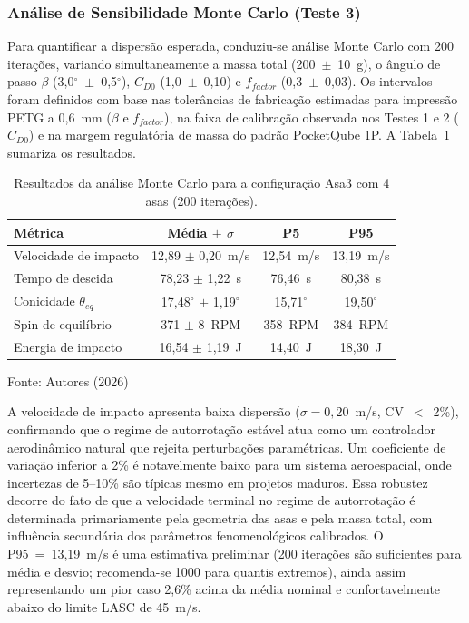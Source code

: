 \documentclass[12pt,fleqn]{article}
\begin{document}
\subsubsection*{Análise de Sensibilidade Monte Carlo (Teste 3)}

Para quantificar a dispersão esperada, conduziu-se análise Monte Carlo com 200 iterações, variando simultaneamente a massa total (200~$\pm$~10~g), o ângulo de passo $\beta$ (3,0$^\circ$~$\pm$~0,5$^\circ$), $C_{D0}$ (1,0~$\pm$~0,10) e $f_{factor}$ (0,3~$\pm$~0,03). Os intervalos foram definidos com base nas tolerâncias de fabricação estimadas para impressão PETG a 0,6~mm ($\beta$ e $f_{factor}$), na faixa de calibração observada nos Testes 1 e 2 ($C_{D0}$) e na margem regulatória de massa do padrão PocketQube 1P. A Tabela~\ref{tab:mc} sumariza os resultados.

\begin{table}[htbp]
\caption{Resultados da análise Monte Carlo para a configuração Asa3 com 4 asas (200 iterações).}
\centering
\begin{tabular*}{\textwidth}{@{\extracolsep{\fill}}lccc}
\hline
Métrica & Média $\pm$ $\sigma$ & P5 & P95 \\
\hline
Velocidade de impacto & 12,89 $\pm$ 0,20~m/s & 12,54~m/s & 13,19~m/s \\
Tempo de descida & 78,23 $\pm$ 1,22~s & 76,46~s & 80,38~s \\
Conicidade $\theta_{eq}$ & 17,48$^\circ$ $\pm$ 1,19$^\circ$ & 15,71$^\circ$ & 19,50$^\circ$ \\
Spin de equilíbrio & 371 $\pm$ 8~RPM & 358~RPM & 384~RPM \\
Energia de impacto & 16,54 $\pm$ 1,19~J & 14,40~J & 18,30~J \\
\hline
\end{tabular*}
{\footnotesize\centering Fonte: Autores (2026)\par}
\label{tab:mc}
\end{table}

A velocidade de impacto apresenta baixa dispersão ($\sigma = 0,20$~m/s, CV~$<$~2\%), confirmando que o regime de autorrotação estável atua como um controlador aerodinâmico natural que rejeita perturbações paramétricas. Um coeficiente de variação inferior a 2\% é notavelmente baixo para um sistema aeroespacial, onde incertezas de 5--10\% são típicas mesmo em projetos maduros. Essa robustez decorre do fato de que a velocidade terminal no regime de autorrotação é determinada primariamente pela geometria das asas e pela massa total, com influência secundária dos parâmetros fenomenológicos calibrados. O P95~=~13,19~m/s é uma estimativa preliminar (200 iterações são suficientes para média e desvio; recomenda-se 1000 para quantis extremos), ainda assim representando um pior caso 2,6\% acima da média nominal e confortavelmente abaixo do limite LASC de 45~m/s.
\end{document}
